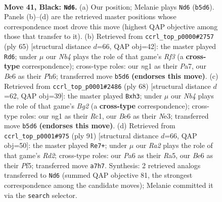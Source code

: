 \documentclass[11pt]{article}
\begin{document}
\clearpage

\begin{figure}[p]\centering
\begin{subfigure}{0.46\textwidth}\centering
\resizebox{\linewidth}{!}{%
\newchessgame
\chessboard[
  setfen={6r1/r7/p1B1bk2/Bn4p1/5pP1/PP6/1K5P/R4RN1 b - - 0 41},
  showmover=false,
  pgfstyle=straightmove, color=movearrow, markmove={b5-d6}
]}
\caption{}
\end{subfigure}\hfill
\begin{subfigure}{0.46\textwidth}\centering
\resizebox{\linewidth}{!}{%
\newchessgame
\chessboard[
  setfen={2r4k/p5p1/5r1p/2bN4/b3p3/7P/P3BPP1/1R3RK1 b - - 0 33},
  showmover=false,
  pgfstyle=straightmove, color=movearrow, markmove={f6-d6}
]}
\caption{}
\end{subfigure}
\\[4pt]
\begin{subfigure}{0.46\textwidth}\centering
\resizebox{\linewidth}{!}{%
\newchessgame
\chessboard[
  setfen={3rr3/2p2pk1/b6n/P7/4P3/4N1Np/5PB1/2R3K1 w - - 0 35},
  showmover=false,
  pgfstyle=straightmove, color=movearrow, markmove={g2-h3}
]}
\caption{}
\end{subfigure}\hfill
\begin{subfigure}{0.46\textwidth}\centering
\resizebox{\linewidth}{!}{%
\newchessgame
\chessboard[
  setfen={1k6/1p1r4/6p1/r1n2p2/PR1P3p/4K2P/4N1P1/1R6 b - - 3 46},
  showmover=false,
  pgfstyle=straightmove, color=movearrow, markmove={d7-e7}
]}
\caption{}
\end{subfigure}
\caption{\textbf{Move 41, Black: \texttt{Nd6}.} (a) Our position; Melanie plays \texttt{Nd6} (\texttt{b5d6}). Panels (b)--(d) are the retrieved master positions whose correspondence most drove this move (highest QAP objective among those that transfer to it). (b) Retrieved from \texttt{ccrl\_top\_p0000\#2757} (ply 65) [structural distance $d$=66, QAP obj=42]: the master played \texttt{Rd6}; under $\mu$ our \emph{Nb4} plays the role of that game's \emph{Rf3} (a \textbf{cross-type} correspondence); cross-type roles: our \emph{n}g1 as their \emph{P}a7, our \emph{B}e6 as their \emph{P}h6; transferred move \texttt{b5d6} \textbf{(endorses this move)}. (c) Retrieved from \texttt{ccrl\_top\_p0001\#2486} (ply 68) [structural distance $d$=62, QAP obj=39]: the master played \texttt{Bxh3}; under $\mu$ our \emph{Nb4} plays the role of that game's \emph{Bg2} (a \textbf{cross-type} correspondence); cross-type roles: our \emph{n}g1 as their \emph{R}c1, our \emph{B}e6 as their \emph{N}e3; transferred move \texttt{b5d6} \textbf{(endorses this move)}. (d) Retrieved from \texttt{ccrl\_top\_p0001\#975} (ply 91) [structural distance $d$=66, QAP obj=50]: the master played \texttt{Re7+}; under $\mu$ our \emph{Ra2} plays the role of that game's \emph{Rd2}; cross-type roles: our \emph{P}a6 as their \emph{R}a5, our \emph{B}e6 as their \emph{P}f5; transferred move \texttt{a7h7}. Synthesis: 2 retrieved analogs transferred to \texttt{Nd6} (summed QAP objective 81, the strongest correspondence among the candidate moves); Melanie committed it via the \texttt{search} selector.}
\label{fig:thought-m81}
\end{figure}
\end{document}
